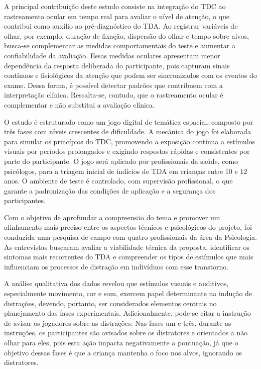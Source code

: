 A principal contribuição deste estudo consiste na integração do TDC ao rastreamento ocular em tempo real para avaliar o nível de atenção, o que contribui como auxílio ao pré-diagnóstico do TDA. Ao registrar variáveis de olhar, por exemplo, duração de fixação, dispersão do olhar e tempo sobre alvos, busca‑se complementar as medidas comportamentais do teste e aumentar a confiabilidade da avaliação. Essas medidas oculares apresentam menor dependência da resposta deliberada do participante, pois capturam sinais contínuos e fisiológicos da atenção que podem ser sincronizados com os eventos do exame. Dessa forma, é possível detectar padrões que contribuem com a interpretação clínica. Ressalta‑se, contudo, que o rastreamento ocular é complementar e não substitui a avaliação clínica.

O estudo é estruturado como um jogo digital de temática espacial, composto por três fases com níveis crescentes de dificuldade. A mecânica do jogo foi elaborada para simular os princípios do TDC, promovendo a exposição contínua a estímulos visuais por períodos prolongados e exigindo respostas rápidas e consistentes por parte do participante. O jogo será aplicado por profissionais da saúde, como psicólogos, para a triagem inicial de indícios de TDA em crianças entre 10 e 12 anos. O ambiente de teste é controlado, com supervisão profissional, o que garante a padronização das condições de aplicação e a segurança dos participantes.

Com o objetivo de aprofundar a compreensão do tema e promover um alinhamento mais preciso entre os aspectos técnicos e psicológicos do projeto, foi conduzida uma pesquisa de campo com quatro profissionais da área da Psicologia. As entrevistas buscaram avaliar a viabilidade técnica da proposta, identificar os sintomas mais recorrentes do TDA e compreender os tipos de estímulos que mais influenciam os processos de distração em indivíduos com esse transtorno.

A análise qualitativa dos dados revelou que estímulos visuais e auditivos, especialmente movimento, cor e som, exercem papel determinante na indução de distrações, devendo, portanto, ser considerados elementos centrais no planejamento das fases experimentais. Adicionalmente, pode-se citar a instrução de avisar os jogadores sobre as distrações. Nas fases um e três, durante as instruções, os participantes são avisados sobre os distratores e orientados a não olhar para eles, pois esta ação impacta negativamente a pontuação, já que o objetivo dessas fases é que a criança mantenha o foco nos alvos, ignorando os distratores. 

